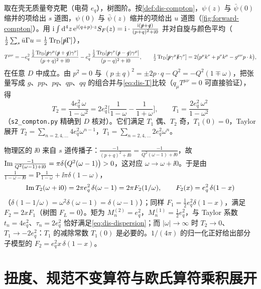 \begin{example}[自由夸克的前向振幅]\label{ex:dis-free-quark}
取在壳无质量夸克靶（电荷 $e_q$），树图阶。按\cref{def:dis-compton}，$\psi(z)$ 与 $\bar\psi(0)$ 缩并的项给出 $s$ 道图，$\psi(0)$ 与 $\bar\psi(z)$ 缩并的项给出 $u$ 道图（\cref{fig:forward-compton}）。用 $\mathrm{i}\int\mathrm{d}^4z\,\mathrm{e}^{\mathrm{i}(q+p)\cdot z}S_F(z)=\mathrm{i}\cdot\frac{\mathrm{i}(\slashed{p}+\slashed{q})}{(p+q)^2+\mathrm{i}0}$ 并对自旋与颜色平均（$\frac12\sum_s\bar u\Gamma u=\frac12\operatorname{Tr}_{\mathrm{D}}[\slashed{p}\Gamma]$），
\[
T^{\mu\nu}=-e_q^2\,\frac{\frac12\operatorname{Tr}_{\mathrm{D}}[\slashed{p}\gamma^\mu(\slashed{p}+\slashed{q})\gamma^\nu]}{(p+q)^2+\mathrm{i}0}-e_q^2\,\frac{\frac12\operatorname{Tr}_{\mathrm{D}}[\slashed{p}\gamma^\nu(\slashed{p}-\slashed{q})\gamma^\mu]}{(p-q)^2+\mathrm{i}0},
\qquad \tfrac12\operatorname{Tr}_{\mathrm{D}}[\slashed{p}\gamma^\mu\slashed{k}\gamma^\nu]=2\big(p^\mu k^\nu+p^\nu k^\mu-g^{\mu\nu}p\cdot k\big),
\]
在任意 $D$ 中成立。由 $p^2=0$ 与 $(p\pm q)^2=\pm2p\cdot q-Q^2=-Q^2(1\mp\omega)$，把张量写成 $g$、$pp$、$pq$、$qp$、$qq$ 的组合并与\cref{eq:dis-T}比较（$q_\mu T^{\mu\nu}=0$ 可直接验证），得
\begin{equation}\label{eq:dis-free-T}
T_2=\frac{4e_q^2\,\omega}{1-\omega^2}=2e_q^2\Big[\frac1{1-\omega}-\frac1{1+\omega}\Big],\qquad T_1=\frac{2e_q^2\,\omega^2}{1-\omega^2}
\end{equation}
（\texttt{s2\_compton.py} 精确到 $D$ 核对）。它们满足 $T_1$ 偶、$T_2$ 奇，$T_1(0)=0$，Taylor 展开 $T_2=\sum_{n=2,4,\dots}4e_q^2\omega^{n-1}$，$T_1=\sum_{n=2,4,\dots}2e_q^2\omega^n$。

物理区的 $\ii0$ 来自 $s$ 道传播子：$\frac{-1}{(p+q)^2+\ii0}=\frac{-1}{Q^2(\omega-1)+\ii0}$，故 $\operatorname{Im}\frac{-1}{Q^2(\omega-1)+\mathrm{i}0}=\pi\delta\big(Q^2(\omega-1)\big)>0$，这对应 $\omega\to\omega+\ii0$。于是由 $\frac1{1-\omega-\ii0}=\mathrm P\frac1{1-\omega}+\ii\pi\delta(1-\omega)$，
\[
\operatorname{Im} T_2(\omega+\mathrm{i}0)=2\pi e_q^2\,\delta(\omega-1)=2\pi F_2(1/\omega),\qquad F_2(x)=e_q^2\,\delta(1-x)
\]
（$\delta(1-1/\omega)=\omega^2\delta(\omega-1)=\delta(\omega-1)$）；同样 $F_1=\frac12e_q^2\delta(1-x)$，满足 $F_2=2xF_1$（树图 $F_L=0$）。矩为 $M^{(2)}_n=e_q^2$，$M^{(1)}_n=\frac12e_q^2$，与 Taylor 系数 $t_n=4e_q^2$、$\tau_n=2e_q^2$ 恰好满足\cref{eq:dis-dispersion}；而 $|\omega|\to\infty$ 时 $T_2\to0$、$T_1\to-2e_q^2$：$T_1$ 的减除常数 $T_1(0)$ 是必要的。$1/(4\pi)$ 的归一化正好给出部分子模型的 $F_2=e_q^2x\,\delta(1-x)$。
\end{example}

\section{扭度、规范不变算符与欧氏算符乘积展开}\label{sec:dis-ope}

